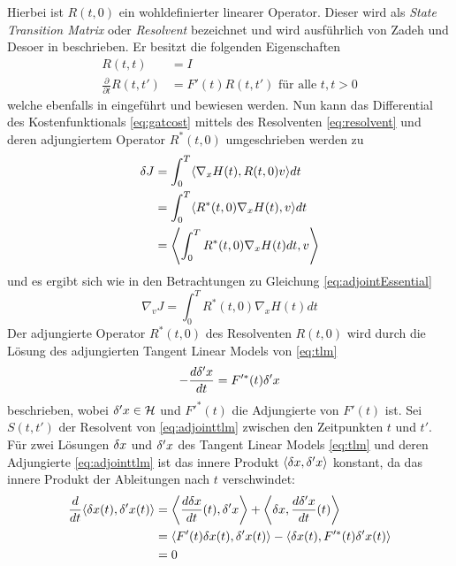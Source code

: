 Hierbei ist $R(t,0)$ ein wohldefinierter linearer Operator. Dieser wird als \textit{State Transition Matrix} oder \textit{Resolvent} bezeichnet und wird ausführlich von Zadeh und Desoer in \cite[S. 339 ff.]{zadeh1976linear} beschrieben. Er besitzt die folgenden Eigenschaften
\begin{align}
  R(t,t) &= I \label{eq:resolventPropertiesA}\\
  \frac{\partial}{\partial t}R(t,t') &= F'(t)R(t,t') \text{ für alle } t,t>0\label{eq:resolventPropertiesB}
\end{align}
welche ebenfalls in \cite[S. 339 Theorem 4]{zadeh1976linear} eingeführt und bewiesen werden.
Nun kann das Differential des Kostenfunktionals \eqref{eq:gatcost} mittels des Resolventen \eqref{eq:resolvent} und deren adjungiertem Operator $R^*(t,0)$ umgeschrieben werden zu
\begin{equation*}
\begin{aligned}
 \delta J &= \int_0^T \langle \nabla_x H(t), R(t,0)v\rangle dt \\
	    &= \int_0^T \langle R^*(t,0) \nabla_x H(t), v\rangle dt \\
	    &= \left\langle \int_0^T R^*(t,0) \nabla_x H(t) dt, v\right\rangle \\
\end{aligned}
\end{equation*}
und es ergibt sich wie in den Betrachtungen zu Gleichung \eqref{eq:adjointEssential} %
\begin{equation}
\label{eq:gradCostFunctional}
 \nabla_v J = \int_0^T R^*(t,0) \nabla_x H(t) dt
\end{equation}
Der adjungierte Operator $R^*(t,0)$ des Resolventen $R(t,0)$ wird durch die Lösung des adjungierten Tangent Linear Models von \eqref{eq:tlm} 
\begin{equation}
\label{eq:adjointtlm}
 -\frac{d \delta'x}{dt} = F'^*(t)\delta'x
\end{equation}
beschrieben, wobei $\delta'x \in\mathcal{H}$ und $F'^*(t)$ die Adjungierte von $F'(t)$ ist. 
Sei $S(t,t')$ der Resolvent von \eqref{eq:adjointtlm} zwischen den Zeitpunkten $t$ und $t'$. Für zwei Lösungen $\delta x$ und $\delta' x$ des Tangent Linear Models \eqref{eq:tlm} und deren Adjungierte \eqref{eq:adjointtlm} ist das innere Produkt $\langle \delta x,\delta' x\rangle$ konstant, da das innere Produkt der Ableitungen nach $t$ verschwindet:
\begin{equation}
\begin{aligned}
 \frac{d}{dt}\langle \delta x(t),\delta' x(t)\rangle  &= \left\langle \frac{d \delta x}{dt}(t) ,\delta' x\right\rangle +\left\langle \delta x,\frac{d\delta ' x}{dt}(t)\right\rangle \\
 &= \langle F'(t)\delta x(t),\delta 'x(t)\rangle - \langle \delta x(t),F'^*(t)\delta' x(t)\rangle\\
 &= 0
\end{aligned}
\end{equation}
